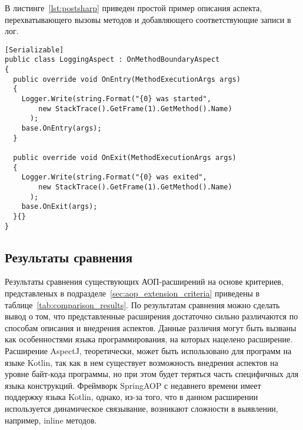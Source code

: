   В листинге~\ref{lst:postsharp} приведен простой пример описания аспекта, 
  перехватывающего вызовы методов и добавляющего соответствующие записи в лог.
  \begin{lstlisting}[style={java},  label={lst:postsharp}, caption={Пример 
  описания аспекта при помощи PostSharp.}]
[Serializable]
public class LoggingAspect : OnMethodBoundaryAspect
{
  public override void OnEntry(MethodExecutionArgs args)
  {
    Logger.Write(string.Format("{0} was started",
        new StackTrace().GetFrame(1).GetMethod().Name)
      );
    base.OnEntry(args);
  }
 
  public override void OnExit(MethodExecutionArgs args)
  {
    Logger.Write(string.Format("{0} was exited",
        new StackTrace().GetFrame(1).GetMethod().Name)
      );
    base.OnExit(args);
  }{}
}
  \end{lstlisting}
\subsection{Результаты сравнения}
\label{sub:comparison_results}
Результаты сравнения существующих АОП-расширений на основе критериев,
представленых в подразделе~\ref{sec:aop_extension_criteria} приведены в
таблице~\ref{tab:comparison_results}.
По результатам сравнения можно сделать вывод о том, что представленные расширения достаточно сильно различаются по способам описания и внедрения аспектов.
Данные различия могут быть вызваны как особенностями языка программирования, на которых нацелено расширение.
Расширение AspectJ, теоретически, может быть использовано для программ на языке Kotlin, так как в нем существует возможность внедрения аспектов на уровне байт-кода программы, но при этом будет теряться часть специфичных для языка конструкций.
Фреймворк SpringAOP с недавнего времени имеет поддержку языка Kotlin, 
однако, из-за того, что в данном расширении используется динамическое связывание, возникают сложности в выявлении, например, inline методов.

